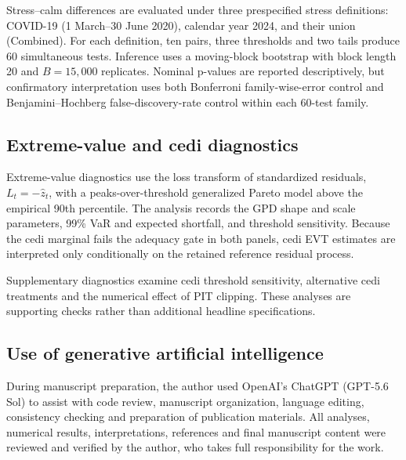 Stress--calm differences are evaluated under three prespecified stress definitions: COVID-19 (1 March--30 June 2020), calendar year 2024, and their union (Combined). For each definition, ten pairs, three thresholds and two tails produce 60 simultaneous tests. Inference uses a moving-block bootstrap with block length 20 and \(B=15{,}000\) replicates. Nominal p-values are reported descriptively, but confirmatory interpretation uses both Bonferroni family-wise-error control and Benjamini--Hochberg false-discovery-rate control within each 60-test family.

\subsection{Extreme-value and cedi diagnostics}

Extreme-value diagnostics use the loss transform of standardized residuals, \(L_t=-\hat z_t\), with a peaks-over-threshold generalized Pareto model above the empirical 90th percentile. The analysis records the GPD shape and scale parameters, 99\% VaR and expected shortfall, and threshold sensitivity. Because the cedi marginal fails the adequacy gate in both panels, cedi EVT estimates are interpreted only conditionally on the retained reference residual process.

Supplementary diagnostics examine cedi threshold sensitivity, alternative cedi treatments and the numerical effect of PIT clipping. These analyses are supporting checks rather than additional headline specifications.

\subsection{Use of generative artificial intelligence}

During manuscript preparation, the author used OpenAI's ChatGPT (GPT-5.6 Sol) to assist with code review, manuscript organization, language editing, consistency checking and preparation of publication materials. All analyses, numerical results, interpretations, references and final manuscript content were reviewed and verified by the author, who takes full responsibility for the work.
